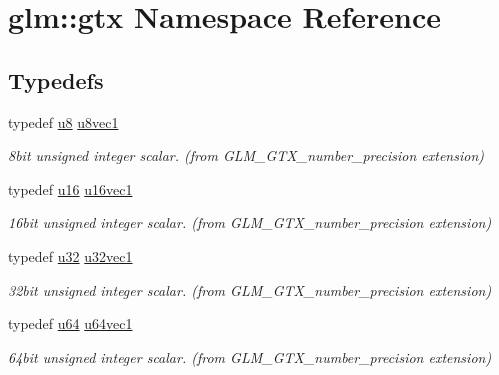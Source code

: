 \hypertarget{namespaceglm_1_1gtx}{}\section{glm\+::gtx Namespace Reference}
\label{namespaceglm_1_1gtx}
\subsection*{Typedefs}
\begin{DoxyCompactItemize}
\item 
typedef \mbox{\hyperlink{group__gtc__type__precision_ga5e3dc67373d5068997d2d9f41c9024d2}{u8}} \mbox{\hyperlink{group__gtx__number__precision_ga35ae7849593a354420e4f52d1b36c2d6}{u8vec1}}
\begin{DoxyCompactList}\small\item\em 8bit unsigned integer scalar. (from G\+L\+M\+\_\+\+G\+T\+X\+\_\+number\+\_\+precision extension) \end{DoxyCompactList}\item 
typedef \mbox{\hyperlink{group__gtc__type__precision_gae7a1571503f83d2264ddfa705a6b082a}{u16}} \mbox{\hyperlink{group__gtx__number__precision_ga807d7e5f24e981b1575bd40ca159781d}{u16vec1}}
\begin{DoxyCompactList}\small\item\em 16bit unsigned integer scalar. (from G\+L\+M\+\_\+\+G\+T\+X\+\_\+number\+\_\+precision extension) \end{DoxyCompactList}\item 
typedef \mbox{\hyperlink{group__gtc__type__precision_ga54e837745059fd29017bed71cfa0a8db}{u32}} \mbox{\hyperlink{group__gtx__number__precision_gac46a7890b20928df83e734c3ea9557d4}{u32vec1}}
\begin{DoxyCompactList}\small\item\em 32bit unsigned integer scalar. (from G\+L\+M\+\_\+\+G\+T\+X\+\_\+number\+\_\+precision extension) \end{DoxyCompactList}\item 
typedef \mbox{\hyperlink{group__gtc__type__precision_ga71cedd4972f9cb1a5e14dfe5ab83ecd7}{u64}} \mbox{\hyperlink{group__gtx__number__precision_ga92812a1d7e746bcaba61d2f5a64afc52}{u64vec1}}
\begin{DoxyCompactList}\small\item\em 64bit unsigned integer scalar. (from G\+L\+M\+\_\+\+G\+T\+X\+\_\+number\+\_\+precision extension) \end{DoxyCompactList}\item 

\end{DoxyCompactItemize}
